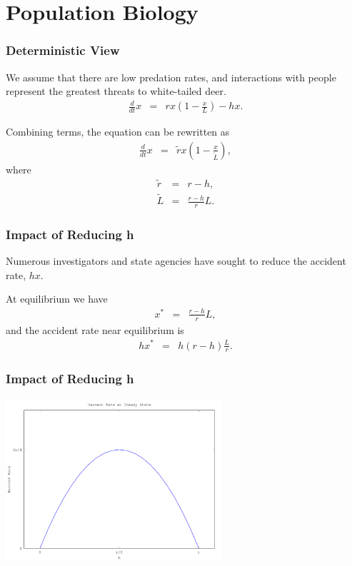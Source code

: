 \documentclass{beamer}   %
\newcommand{\lp}{\left(}
\newcommand{\rp}{\right)}
\begin{document}
\section{Population Biology}

\begin{frame}
  \frametitle{Deterministic View}

  We assume that there are low predation rates, and interactions with
  people represent the greatest threats to white-tailed deer.
  \begin{eqnarray*}
    \frac{d}{dt} x & = & r x \lp 1 - \frac{x}{L} \rp - h x.
  \end{eqnarray*}

  Combining terms, the equation can be rewritten as
  \begin{eqnarray*}
    \frac{d}{dt} x & = & \tilde{r} x \lp 1 - \frac{x}{\tilde{L}} \rp,
  \end{eqnarray*}
  where
  \begin{eqnarray*}
    \tilde{r} & = & r-h, \\
    \tilde{L} & = & \frac{r-h}{r} L.
  \end{eqnarray*}
  
\end{frame}

\begin{frame}
  \frametitle{Impact of Reducing h}

  Numerous investigators and state agencies have sought to reduce the
  accident rate, $hx$. 

  \vfill

  At equilibrium we have
  \begin{eqnarray*}
    x^* & = & \frac{r-h}{r} L,
  \end{eqnarray*}
  and the accident rate near equilibrium is
  \begin{eqnarray*}
    h x^* & = & h(r-h)\frac{L}{r}.
  \end{eqnarray*}
  
\end{frame}

\begin{frame}
  \frametitle{Impact of Reducing h}
  \centerline{\includegraphics[height=6cm]{reducedHarvest}}
\end{frame}
\end{document}

